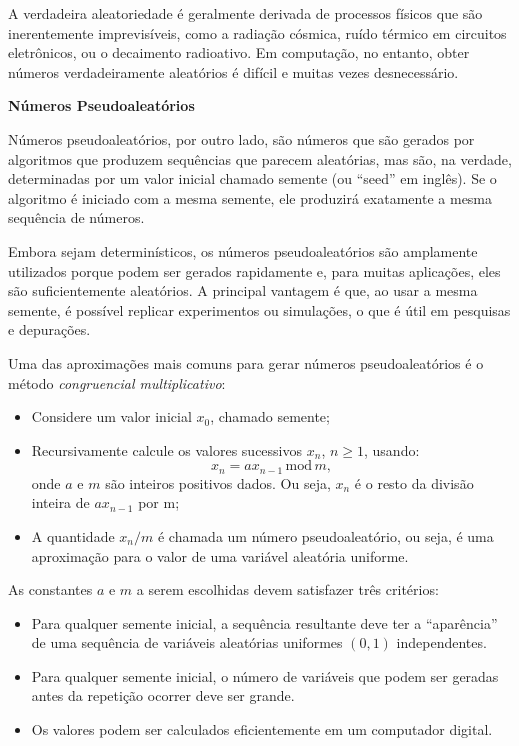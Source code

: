 \documentclass[
]{book}
\begin{document}
A verdadeira aleatoriedade é geralmente derivada de processos físicos que são inerentemente imprevisíveis, como a radiação cósmica, ruído térmico em circuitos eletrônicos, ou o decaimento radioativo. Em computação, no entanto, obter números verdadeiramente aleatórios é difícil e muitas vezes desnecessário.

\textbf{Números Pseudoaleatórios}

Números pseudoaleatórios, por outro lado, são números que são gerados por algoritmos que produzem sequências que parecem aleatórias, mas são, na verdade, determinadas por um valor inicial chamado semente (ou ``seed'' em inglês). Se o algoritmo é iniciado com a mesma semente, ele produzirá exatamente a mesma sequência de números.

Embora sejam determinísticos, os números pseudoaleatórios são amplamente utilizados porque podem ser gerados rapidamente e, para muitas aplicações, eles são suficientemente aleatórios. A principal vantagem é que, ao usar a mesma semente, é possível replicar experimentos ou simulações, o que é útil em pesquisas e depurações.

Uma das aproximações mais comuns para gerar números pseudoaleatórios é o método \emph{congruencial multiplicativo}:

\begin{itemize}
\item
  Considere um valor inicial \(x_0\), chamado semente;
\item
  Recursivamente calcule os valores sucessivos \(x_{n}\), \(n\geq 1\), usando: \[x_{n} = ax_{n-1} \, \text{mod}\, m,\] onde \(a\) e \(m\) são inteiros positivos dados. Ou seja, \(x_{n}\) é o resto da divisão inteira de \(ax_{n-1}\) por m;
\item
  A quantidade \(x_{n}/m\) é chamada um número pseudoaleatório, ou seja, é uma aproximação para o valor de uma variável aleatória uniforme.
\end{itemize}

As constantes \(a\) e \(m\) a serem escolhidas devem satisfazer três critérios:

\begin{itemize}
\item
  Para qualquer semente inicial, a sequência resultante deve ter a ``aparência'' de uma sequência de variáveis aleatórias uniformes \((0,1)\) independentes.
\item
  Para qualquer semente inicial, o número de variáveis que podem ser geradas antes da repetição ocorrer deve ser grande.
\item
  Os valores podem ser calculados eficientemente em um computador digital.
\end{itemize}
\end{document}
